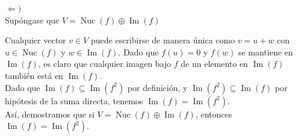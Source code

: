 \begin{solution}
$\Leftarrow )$ \\
Supóngase que \( V = \operatorname{Nuc}(f) \oplus \operatorname{Im}(f) \)


Cualquier vector \( v \in V \) puede escribirse de manera única como \( v = u + w \) con \( u \in \operatorname{Nuc}(f) \) y \( w \in \operatorname{Im}(f) \). Dado que \( f(u) = 0 \) y \( f(w) \) se mantiene en \( \operatorname{Im}(f) \), es claro que cualquier imagen bajo \( f \) de un elemento en \( \operatorname{Im}(f) \) también está en \( \operatorname{Im}(f) \). \\
Dado que \( \operatorname{Im}(f) \subseteq \operatorname{Im}(f^2) \) por definición, y \( \operatorname{Im}(f^2) \subseteq \operatorname{Im}(f) \) por hipótesis de la suma directa, tenemos \( \operatorname{Im}(f) = \operatorname{Im}(f^2) \). \\

Así, demostramos que si \( V = \operatorname{Nuc}(f) \oplus \operatorname{Im}(f) \), entonces \( \operatorname{Im}(f) = \operatorname{Im}(f^2) \). \end{solution}